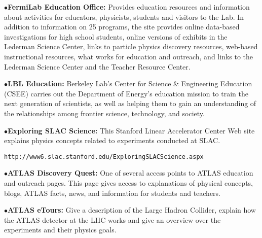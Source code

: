\medskip

\item{$\bullet$}{\bf FermiLab Education Office:} 
Provides  education resources and information about activities for educators, physicists, students and visitors to the Lab. In addition to information on 25 programs, the site  provides online data-based investigations for high school students, online versions of exhibits in the Lederman Science Center, links to particle physics discovery resources, web-based instructional resources, what works for education and outreach, and links to the Lederman Science Center and the Teacher Resource Center.
	\item{}

\medskip

\item{$\bullet$}{\bf LBL Education:} 
Berkeley Lab's Center for Science \& Engineering Education (CSEE) carries out the Department of Energy’s education mission to train the next generation of scientists, as well as helping them to gain an understanding of the relationships among frontier science, technology, and society.
	\item{}

\medskip

\item{$\bullet$}{\bf Exploring SLAC Science:}
This Stanford Linear Accelerator Center Web site explains physics concepts related to experiments conducted at SLAC.
	\item{}{\tt http://www6.slac.stanford.edu/ExploringSLACScience.aspx}



\medskip
\medskip



\medskip

\item{$\bullet$}{\bf ATLAS Discovery Quest:} 
One of several access points to ATLAS education and outreach pages. This page gives access to explanations of physical concepts, blogs, ATLAS facts, news, and information for students and teachers.
   \item{}     


\item{$\bullet$}{\bf ATLAS eTours:} 
Give a description of the Large Hadron Collider, explain how the ATLAS detector at the LHC works and give an overview over the experiments and their physics goals. 
	\item{}

